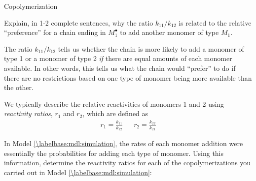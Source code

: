 \begin{activity}{Copolymerization}
\begin{ctqs}
		\begin{solution}[1in]\end{solution}
	
	\question Explain, in 1-2 complete sentences, why the ratio $k_{11}/k_{12}$ is related to the relative ``preference'' for a chain ending in $M_1^\bullet$ to add another monomer of type $M_1$.
	
		\begin{solution}[1.5in]
			The ratio $k_{11}/k_{12}$ tells us whether the chain is more likely to add a monomer of type 1 or a monomer of type 2 \emph{if} there are equal amounts of each monomer available.  In other words, this tells us what the chain would ``prefer'' to do if there are no restrictions based on one type of monomer being more available than the other.
		\end{solution}
	
\end{ctqs}

\begin{infobox}

	We typically  describe the relative reactivities of monomers 1 and 2 using \emph{reactivity ratios}, $r_1$ and $r_2$, which are defined as
	\begin{align*}
		r_1 = \frac{k_{11}}{k_{12}} && r_2 = \frac{k_{22}}{k_{21}}
	\end{align*}

\end{infobox}

\begin{ctqs}

	\question In Model \ref{\labelbase:mdl:simulation}, the rates of each monomer addition were essentially the probabilities for adding each type of monomer.  Using this information, determine the reactivity ratios for each of the copolymerizations you carried out in Model \ref{\labelbase:mdl:simulation}:
	

\end{ctqs}
\end{activity}
